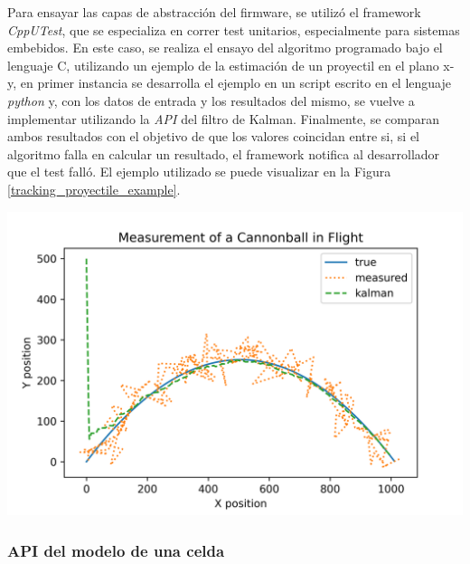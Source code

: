 \documentclass[10pt, a4paper]{article}
\begin{document}
\begin{minipage}{0.5\textwidth}
Para ensayar las capas de abstracci\'on del firmware, se utiliz\'o el
framework \emph{CppUTest}, que se especializa en correr test unitarios,
especialmente para sistemas embebidos. En este caso, se realiza el ensayo del
algoritmo programado bajo el lenguaje C, utilizando un ejemplo de la
estimaci\'on de un proyectil en el plano x-y, en primer instancia se desarrolla
el ejemplo en un script escrito en el lenguaje \emph{python} y, con los
datos de entrada y los resultados del mismo, se vuelve a implementar utilizando
la \emph{API} del filtro de Kalman. Finalmente, se comparan ambos resultados con
el objetivo de que los valores coincidan entre si, si el algoritmo falla en
calcular un resultado, el framework notifica al desarrollador que el test
fall\'o. El ejemplo utilizado se puede visualizar en la Figura
\ref{tracking_proyectile_example}.
\end{minipage}
\begin{minipage}{0.5\textwidth}
    \begin{center}
        \includegraphics[width=1\textwidth]{tracking_proyectile_example.png}
        \label{tracking_proyectile_example}
    \end{center}
\end{minipage}

\subsubsection{\acrshort{API} del modelo de una celda}
\end{document}

